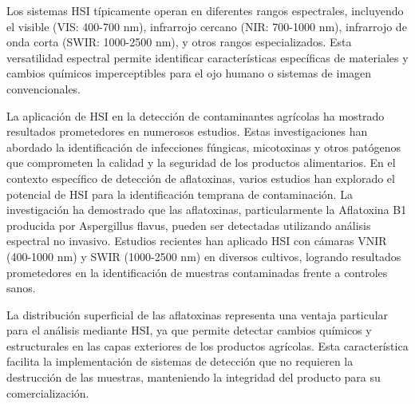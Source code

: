 \vspace{5mm}

Los sistemas HSI típicamente operan en diferentes rangos espectrales, incluyendo el visible (VIS: 400-700 nm), infrarrojo cercano (NIR: 700-1000 nm), infrarrojo de onda corta (SWIR: 1000-2500 nm), y otros rangos especializados. Esta versatilidad espectral permite identificar características específicas de materiales y cambios químicos imperceptibles para el ojo humano o sistemas de imagen convencionales.

\vspace{5mm}

La aplicación de HSI en la detección de contaminantes agrícolas ha mostrado resultados prometedores en numerosos estudios. Estas investigaciones han abordado la identificación de infecciones fúngicas, micotoxinas y otros patógenos que comprometen la calidad y la seguridad de los productos alimentarios. En el contexto específico de detección de aflatoxinas, varios estudios han explorado el potencial de HSI para la identificación temprana de contaminación. La investigación ha demostrado que las aflatoxinas, particularmente la Aflatoxina B1 producida por Aspergillus flavus, pueden ser detectadas utilizando análisis espectral no invasivo. Estudios recientes han aplicado HSI con cámaras VNIR (400-1000 nm) y SWIR (1000-2500 nm) en diversos cultivos, logrando resultados prometedores en la identificación de muestras contaminadas frente a controles sanos.

\vspace{5mm}

La distribución superficial de las aflatoxinas representa una ventaja particular para el análisis mediante HSI, ya que permite detectar cambios químicos y estructurales en las capas exteriores de los productos agrícolas. Esta característica facilita la implementación de sistemas de detección que no requieren la destrucción de las muestras, manteniendo la integridad del producto para su comercialización.

\vspace{5mm}

